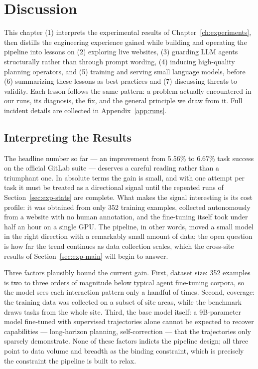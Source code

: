 \chapter{Discussion}
\label{ch:discussion}

This chapter (1) interprets the experimental results of
Chapter~\ref{ch:experiments}, then distills the engineering experience gained
while building and operating the pipeline into lessons on (2) exploring live
websites, (3) guarding LLM agents structurally rather than through prompt
wording, (4) inducing high-quality planning operators, and (5) training and
serving small language models, before (6) summarizing these lessons as best
practices and (7) discussing threats to validity. Each lesson follows the
same pattern: a problem actually encountered in our runs, its diagnosis, the
fix, and the general principle we draw from it. Full incident details are
collected in Appendix~\ref{app:runs}.

\section{Interpreting the Results}
\label{sec:disc-results}


The headline number so far --- an improvement from 5.56\% to 6.67\% task
success on the official GitLab suite --- deserves a careful reading rather
than a triumphant one. In absolute terms the gain is small, and with one
attempt per task it must be treated as a directional signal until the
repeated runs of Section~\ref{sec:exp-stats} are complete. What makes the
signal interesting is its cost profile: it was obtained from only 352
training examples, collected autonomously from a website with no human
annotation, and the fine-tuning itself took under half an hour on a single
GPU. The pipeline, in other words, moved a small model in the right direction
with a remarkably small amount of data; the open question is how far the
trend continues as data collection scales, which the cross-site results of
Section~\ref{sec:exp-main} will begin to answer.

Three factors plausibly bound the current gain. First, dataset size: 352
examples is two to three orders of magnitude below typical agent fine-tuning
corpora, so the model sees each interaction pattern only a handful of times.
Second, coverage: the training data was collected on a subset of site areas,
while the benchmark draws tasks from the whole site. Third, the base model
itself: a 9B-parameter model fine-tuned with supervised trajectories alone
cannot be expected to recover capabilities --- long-horizon planning,
self-correction --- that the trajectories only sparsely demonstrate. None of
these factors indicts the pipeline design; all three point to data volume
and breadth as the binding constraint, which is precisely the constraint the
pipeline is built to relax.

